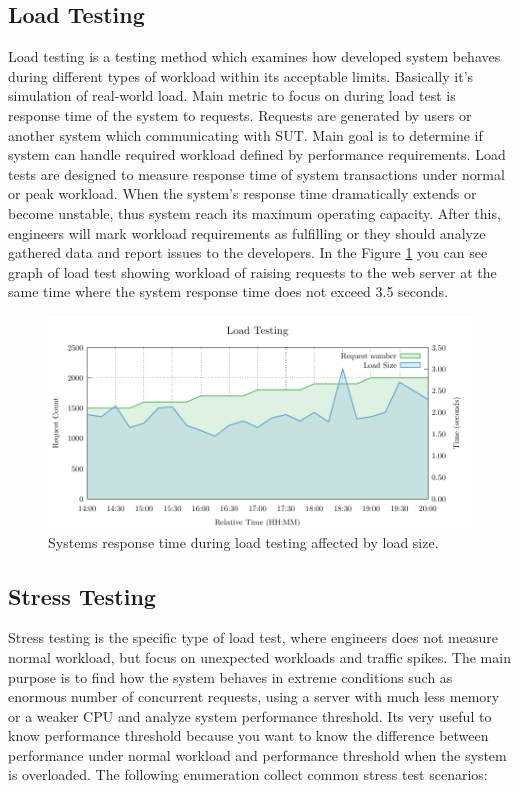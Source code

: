 \subsection*{Load Testing}
Load testing is a testing method which examines how developed system behaves during different types of workload within its acceptable limits. Basically it's simulation of real-world load. Main metric to focus on during load test is response time of the system to requests. Requests are generated by users or another system which communicating with SUT. Main goal is to determine if system can handle required workload defined by performance requirements. Load tests are designed to measure response time of system transactions under normal or peak workload. When the system's response time dramatically extends or become unstable, thus system reach its maximum operating capacity. After this, engineers will mark workload requirements as fulfilling or they should analyze gathered data and report issues to the developers. In the Figure \ref{fig:load_test} you can see graph of load test showing workload of raising requests to the web server at the same time where the system response time does not exceed 3.5 seconds.

\begin{figure}[H]
  \centering
  \includegraphics[width=15cm]{obrazky-figures/load_testing.pdf}
  \caption{Systems response time during load testing affected by load size.}
  \label{fig:load_test}
\end{figure}

\subsection*{Stress Testing}
\label{Stress Testing}
Stress testing is the specific type of load test, where engineers does not measure normal workload, but focus on unexpected workloads and traffic spikes. The main purpose is to find how the system behaves in extreme conditions such as enormous number of concurrent requests, using a server with much less memory or a weaker CPU and analyze system performance threshold. Its very useful to know performance threshold because you want to know the difference between performance under normal workload and performance threshold when the system is overloaded. The following enumeration collect common stress test scenarios: 

